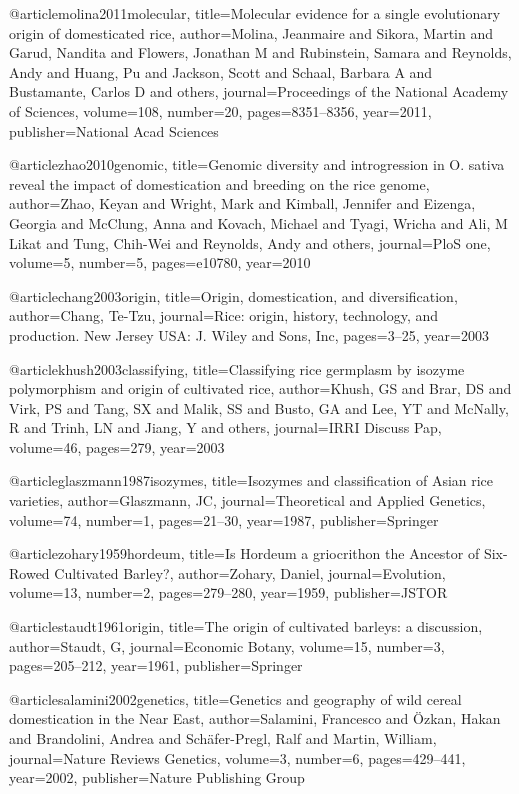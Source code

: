 {@article{molina2011molecular,
  title={Molecular evidence for a single evolutionary origin of domesticated rice},
  author={Molina, Jeanmaire and Sikora, Martin and Garud, Nandita and Flowers, Jonathan M and Rubinstein, Samara and Reynolds, Andy and Huang, Pu and Jackson, Scott and Schaal, Barbara A and Bustamante, Carlos D and others},
  journal={Proceedings of the National Academy of Sciences},
  volume={108},
  number={20},
  pages={8351--8356},
  year={2011},
  publisher={National Acad Sciences}
}

@article{zhao2010genomic,
  title={Genomic diversity and introgression in O. sativa reveal the impact of domestication and breeding on the rice genome},
  author={Zhao, Keyan and Wright, Mark and Kimball, Jennifer and Eizenga, Georgia and McClung, Anna and Kovach, Michael and Tyagi, Wricha and Ali, M Likat and Tung, Chih-Wei and Reynolds, Andy and others},
  journal={PloS one},
  volume={5},
  number={5},
  pages={e10780},
  year={2010}
}

@article{chang2003origin,
  title={Origin, domestication, and diversification},
  author={Chang, Te-Tzu},
  journal={Rice: origin, history, technology, and production. New Jersey USA: J. Wiley and Sons, Inc},
  pages={3--25},
  year={2003}
}

@article{khush2003classifying,
  title={Classifying rice germplasm by isozyme polymorphism and origin of cultivated rice},
  author={Khush, GS and Brar, DS and Virk, PS and Tang, SX and Malik, SS and Busto, GA and Lee, YT and McNally, R and Trinh, LN and Jiang, Y and others},
  journal={IRRI Discuss Pap},
  volume={46},
  pages={279},
  year={2003}
}

@article{glaszmann1987isozymes,
  title={Isozymes and classification of Asian rice varieties},
  author={Glaszmann, JC},
  journal={Theoretical and Applied Genetics},
  volume={74},
  number={1},
  pages={21--30},
  year={1987},
  publisher={Springer}
}

@article{zohary1959hordeum,
  title={Is Hordeum a griocrithon the Ancestor of Six-Rowed Cultivated Barley?},
  author={Zohary, Daniel},
  journal={Evolution},
  volume={13},
  number={2},
  pages={279--280},
  year={1959},
  publisher={JSTOR}
}

@article{staudt1961origin,
  title={The origin of cultivated barleys: a discussion},
  author={Staudt, G},
  journal={Economic Botany},
  volume={15},
  number={3},
  pages={205--212},
  year={1961},
  publisher={Springer}
}

@article{salamini2002genetics,
  title={Genetics and geography of wild cereal domestication in the Near East},
  author={Salamini, Francesco and {\"O}zkan, Hakan and Brandolini, Andrea and Sch{\"a}fer-Pregl, Ralf and Martin, William},
  journal={Nature Reviews Genetics},
  volume={3},
  number={6},
  pages={429--441},
  year={2002},
  publisher={Nature Publishing Group}
}

}

